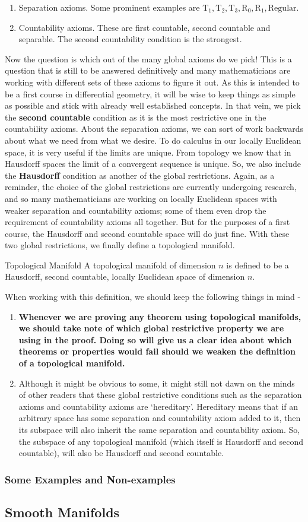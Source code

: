 \begin{enumerate}
	\item Separation axioms. Some prominent examples are $\mathrm{T}_1,\mathrm{T}_2,\mathrm{T}_3,\mathrm{R}_0,\mathrm{R}_1,\mathrm{Regular}$.
	\item Countability axioms. These are first countable, second countable and separable. The second countability condition is the strongest.
\end{enumerate}
Now the question is which out of the many global axioms do we pick! This is a question that is still to be answered definitively and many mathematicians are working with different sets of these axioms to figure it out. As this is intended to be a first course in differential geometry, it will be wise to keep things as simple as possible and stick with already well established concepts. In that vein, we pick the \textbf{second countable} condition as it is the most restrictive one in the countability axioms. About the separation axioms, we can sort of work backwards about what we need from what we desire. To do calculus in our locally Euclidean space, it is very useful if the limits are unique. From topology we know that in Hausdorff spaces the limit of a convergent sequence is unique. So, we also include the \textbf{Hausdorff} condition as another of the global restrictions. Again, as a reminder, the choice of the global restrictions are currently undergoing research, and so many mathematicians are working on locally Euclidean spaces with weaker separation and countability axioms; some of them even drop the requirement of countability axioms all together. But for the purposes of a first course, the Hausdorff and second countable space will do just fine. With these two global restrictions, we finally define a topological manifold.
\begin{Definition}{Topological Manifold}\label{topological_manifold}
	A topological manifold of dimension $n$ is defined to be a Hausdorff, second countable, locally Euclidean space of dimension $n$.
\end{Definition}
\noindent When working with this definition, we should keep the following things in mind -
\begin{enumerate}
	\item \textbf{Whenever we are proving any theorem using topological manifolds, we should take note of which global restrictive property we are using in the proof. Doing so will give us a clear idea about which theorems or properties would fail should we weaken the definition of a topological manifold.}
	\item Although it might be obvious to some, it might still not dawn on the minds of other readers that these global restrictive conditions such as the separation axioms and countability axioms are `hereditary'. Hereditary means that if an arbitrary space has some separation and countability axiom added to it, then its subspace will also inherit the same separation and countability axiom. So, the subspace of any topological manifold (which itself is Hausdorff and second countable), will also be Hausdorff and second countable.
\end{enumerate}
\subsubsection{Some Examples and Non-examples}
\subsection{Smooth Manifolds}